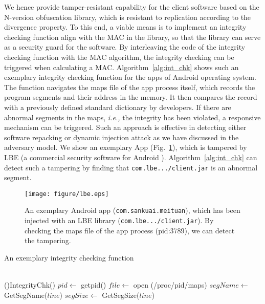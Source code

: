 \documentclass[10pt, conference]{IEEEtran}
\begin{document}
We hence provide tamper-resistant capability for the client software based on the N-version obfuscation library, which is resistant to replication according to the divergence property.  To this end, a viable means is to implement an integrity checking function align with the MAC in the library, so that the library can serve as a security guard for the software.  By interleaving the code of the integrity checking function with the MAC algorithm, the integrity checking can be triggered when calculating a MAC.  Algorithm~\ref{alg:int_chk} shows such an exemplary integrity checking function for the apps of Android operating system.  The function navigates the maps file of the app process itself, which records the program segments and their address in the memory.  It then compares the record with a previously defined standard dictionary by developers.  If there are abnormal segments in the maps, \textit{i.e.,} the integrity has been violated, a responsive mechanism can be triggered.  Such an approach is effective in detecting either software repacking or dynamic injection attack as we have discussed in the adversary model.  We show an exemplary App (Fig.~\ref{fig:lbe}), which is tampered by LBE (a commercial security software for Android \cite{lbe}).  Algorithm~\ref{alg:int_chk} can detect such a tampering by finding that \texttt{com.lbe.../client.jar} is an abnormal segment.


\begin{figure}[t]
\centering
\texttt{[image: figure/lbe.eps]}
\caption{An exemplary Android app (\texttt{com.sankuai.meituan}), which has been injected with an LBE library (\texttt{com.lbe.../client.jar}).  By checking the maps file of the app process (pid:3789), we can detect the tampering.}
\label{fig:lbe}
\end{figure}

\begin{algorithm} [t]
\caption{An exemplary integrity checking function}
\label{alg:int_chk}
\small
{}  \\
\Fn(){IntegrityChk()}{}
	$pid \gets$ getpid()\;
	$file \gets$ open (/proc/pid/maps)\;
	 {		
		$segName \gets$ GetSegName($line$)\;
		$segSize \gets$ GetSegSize($line$)\;
		{
		}
	}
\end{algorithm}
\end{document}
